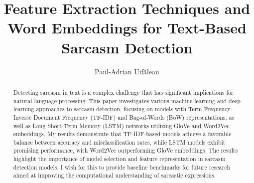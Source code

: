 \documentclass[runningheads]{llncs}
\begin{document}
    \title{Feature Extraction Techniques and Word Embeddings for Text-Based Sarcasm Detection}

    \author{Paul-Adrian Uif\u{a}lean}

    
    \maketitle 
    
    \begin{abstract}
        Detecting sarcasm in text is a complex challenge that has significant implications for natural language processing. This paper investigates various machine learning and deep 
        learning approaches to sarcasm detection, focusing on models with Term Frequency-Inverse Document Frequency (TF-IDF) and Bag-of-Words (BoW) representations, as well as 
        Long Short-Term Memory (LSTM) networks utilizing GloVe and Word2Vec embeddings. My results demonstrate that TF-IDF-based models achieve a favorable balance between accuracy and 
        misclassification rates, while LSTM models exhibit promising performance, with Word2Vec outperforming GloVe embeddings. The results highlight the importance of model selection and 
        feature representation in sarcasm detection models. I wish for this to provide baseline benchmarks for future research aimed at improving the computational understanding of sarcastic expressions.
    \end{abstract}
    

    
    
    
    
    
    
    
    
    
\end{document}
